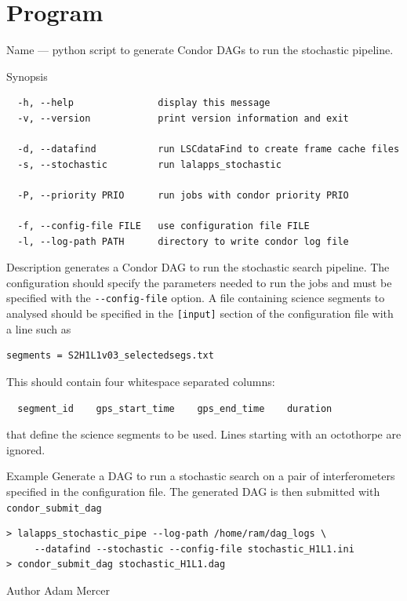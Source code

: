 \clearpage
\section{Program }
\label{program:lalapps-stochastic-pipe}

\begin{entry}
\item[Name]
 --- python script to generate Condor DAGs
to run the stochastic pipeline.

\item[Synopsis]
\begin{verbatim}
  -h, --help               display this message
  -v, --version            print version information and exit

  -d, --datafind           run LSCdataFind to create frame cache files
  -s, --stochastic         run lalapps_stochastic

  -P, --priority PRIO      run jobs with condor priority PRIO

  -f, --config-file FILE   use configuration file FILE
  -l, --log-path PATH      directory to write condor log file
\end{verbatim}

\item[Description]  generates a Condor DAG
to run the stochastic search pipeline. The configuration should specify
the parameters needed to run the jobs and must be specified with the
\verb$--config-file$ option. A file containing science segments to
analysed should be specified in the \verb$[input]$ section of the
configuration file with a line such as

\begin{verbatim}
segments = S2H1L1v03_selectedsegs.txt
\end{verbatim}

This should contain four whitespace separated columns:

\begin{verbatim}
  segment_id    gps_start_time    gps_end_time    duration
\end{verbatim}

that define the science segments to be used. Lines starting with an
octothorpe are ignored.

\item[Example]
Generate a DAG to run a stochastic search on a pair of interferometers
specified in the configuration file. The generated DAG is then submitted
with \texttt{condor\_submit\_dag}

\begin{verbatim}
> lalapps_stochastic_pipe --log-path /home/ram/dag_logs \
     --datafind --stochastic --config-file stochastic_H1L1.ini
> condor_submit_dag stochastic_H1L1.dag
\end{verbatim}

\item[Author]
Adam Mercer
\end{entry}

